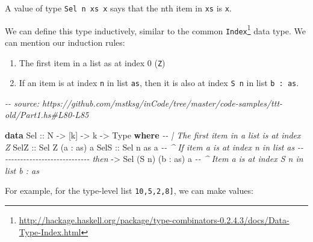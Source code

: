 \documentclass[]{article}
\newenvironment{Shaded}{}{}
\newcommand{\CommentTok}[1]{\textcolor[rgb]{0.38,0.63,0.69}{\textit{#1}}}
\newcommand{\DataTypeTok}[1]{\textcolor[rgb]{0.56,0.13,0.00}{#1}}
\newcommand{\KeywordTok}[1]{\textcolor[rgb]{0.00,0.44,0.13}{\textbf{#1}}}
\newcommand{\NormalTok}[1]{#1}
\newcommand{\OperatorTok}[1]{\textcolor[rgb]{0.40,0.40,0.40}{#1}}
\newcommand{\OtherTok}[1]{\textcolor[rgb]{0.00,0.44,0.13}{#1}}
\renewcommand{\href}[2]{#2\footnote{\url{#1}}}
\begin{document}
A value of type \texttt{Sel\ n\ xs\ x} says that the nth item in \texttt{xs} is
\texttt{x}.

We can define this type inductively, similar to the common
\href{http://hackage.haskell.org/package/type-combinators-0.2.4.3/docs/Data-Type-Index.html}{\texttt{Index}}
data type. We can mention our induction rules:

\begin{enumerate}
\def\labelenumi{\arabic{enumi}.}
\tightlist
\item
  The first item in a list as at index 0 (\texttt{Z})
\item
  If an item is at index \texttt{n} in list \texttt{as}, then it is also at
  index \texttt{S\ n} in list \texttt{b\ \textquotesingle{}:\ as}.
\end{enumerate}

\begin{Shaded}
\begin{Highlighting}[]
\CommentTok{{-}{-} source: https://github.com/mstksg/inCode/tree/master/code{-}samples/ttt{-}old/Part1.hs\#L80{-}L85}

\KeywordTok{data} \DataTypeTok{Sel}\OtherTok{ ::} \DataTypeTok{N} \OtherTok{{-}\textgreater{}}\NormalTok{ [k] }\OtherTok{{-}\textgreater{}}\NormalTok{ k }\OtherTok{{-}\textgreater{}} \DataTypeTok{Type} \KeywordTok{where}
    \CommentTok{{-}{-} | The first item in a list is at index \textquotesingle{}\textquotesingle{}Z\textquotesingle{}}
    \DataTypeTok{SelZ}\OtherTok{ ::} \DataTypeTok{Sel} \DataTypeTok{\textquotesingle{}Z}\NormalTok{ (a \textquotesingle{}}\OperatorTok{:}\NormalTok{ as) a}
    \DataTypeTok{SelS}\OtherTok{ ::} \DataTypeTok{Sel}\NormalTok{     n        as  a  }\CommentTok{{-}{-} \^{} If item \textasciigrave{}a\textasciigrave{} is at index \textasciigrave{}n\textasciigrave{} in list \textasciigrave{}as\textasciigrave{}}
         \CommentTok{{-}{-} {-}{-}{-}{-}{-}{-}{-}{-}{-}{-}{-}{-}{-}{-}{-}{-}{-}{-}{-}{-}{-}{-}{-}{-}{-}{-}{-}{-} then}
         \OtherTok{{-}\textgreater{}} \DataTypeTok{Sel}\NormalTok{ (}\DataTypeTok{\textquotesingle{}S}\NormalTok{ n) (b \textquotesingle{}}\OperatorTok{:}\NormalTok{ as) a  }\CommentTok{{-}{-} \^{} Item \textasciigrave{}a\textasciigrave{} is at index \textasciigrave{}S n\textasciigrave{} in list \textasciigrave{}b : as\textasciigrave{}}
\end{Highlighting}
\end{Shaded}

For example, for the type-level list \texttt{\textquotesingle{}{[}10,5,2,8{]}},
we can make values:
\end{document}
